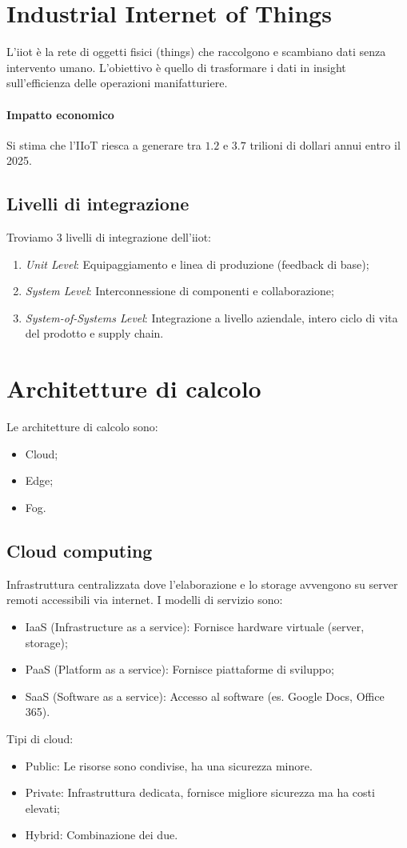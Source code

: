 %
\section{Industrial Internet of Things}
L'\gls{iiot} è la rete di oggetti fisici (things) che raccolgono e scambiano dati senza intervento umano. L'obiettivo è quello di trasformare i dati in insight sull'efficienza delle operazioni manifatturiere.
%
\paragraph{Impatto economico} Si stima che l'IIoT riesca a generare tra $ 1.2 $ e $ 3.7 $ trilioni di dollari annui entro il 2025.
%
\subsection{Livelli di integrazione}
Troviamo 3 livelli di integrazione dell'\gls{iiot}:
\begin{enumerate}
    \item \emph{Unit Level}: Equipaggiamento e linea di produzione (feedback di base);
    \item \emph{System Level}: Interconnessione di componenti e collaborazione;
    \item \emph{System-of-Systems Level}: Integrazione a livello aziendale, intero ciclo di vita del prodotto e supply chain.
\end{enumerate}

%
\section{Architetture di calcolo}
Le architetture di calcolo sono:
\begin{itemize}
    \item Cloud;
    \item Edge;
    \item Fog.
\end{itemize}
%
\subsection{Cloud computing}
Infrastruttura centralizzata dove l'elaborazione e lo storage avvengono su server remoti accessibili via internet.
I modelli di servizio sono:
\begin{itemize}
    \item IaaS (Infrastructure as a service): Fornisce hardware virtuale (server, storage);
    \item PaaS (Platform as a service): Fornisce piattaforme di sviluppo;
    \item SaaS (Software as a service): Accesso al software (es. Google Docs, Office 365).
\end{itemize}
Tipi di cloud:
\begin{itemize}
    \item Public: Le risorse sono condivise, ha una sicurezza minore.
    \item Private: Infrastruttura dedicata, fornisce migliore sicurezza ma ha costi elevati;
    \item Hybrid: Combinazione dei due.
\end{itemize}
%
